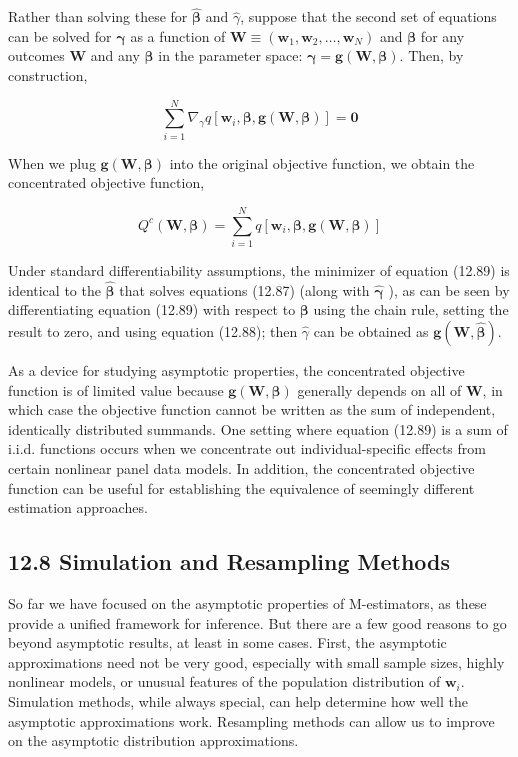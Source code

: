 \documentclass[10pt]{article}
\begin{document}
Rather than solving these for $\hat{\boldsymbol{\beta}}$ and $\hat{\gamma}$, suppose that the second set of equations can be solved for $\boldsymbol{\gamma}$ as a function of $\mathbf{W} \equiv\left(\mathbf{w}_{1}, \mathbf{w}_{2}, \ldots, \mathbf{w}_{N}\right)$ and $\boldsymbol{\beta}$ for any outcomes $\mathbf{W}$ and any $\boldsymbol{\beta}$ in the parameter space: $\boldsymbol{\gamma}=\mathbf{g}(\mathbf{W}, \boldsymbol{\beta})$. Then, by construction,


\begin{equation*}
\sum_{i=1}^{N} \nabla_{\gamma} q\left[\mathbf{w}_{i}, \boldsymbol{\beta}, \mathbf{g}(\mathbf{W}, \boldsymbol{\beta})\right]=\mathbf{0} \tag{12.88}
\end{equation*}


When we plug $\boldsymbol{g}(\mathbf{W}, \boldsymbol{\beta})$ into the original objective function, we obtain the concentrated objective function,


\begin{equation*}
Q^{c}(\mathbf{W}, \boldsymbol{\beta})=\sum_{i=1}^{N} q\left[\mathbf{w}_{i}, \boldsymbol{\beta}, \mathbf{g}(\mathbf{W}, \boldsymbol{\beta})\right] \tag{12.89}
\end{equation*}


Under standard differentiability assumptions, the minimizer of equation (12.89) is identical to the $\hat{\boldsymbol{\beta}}$ that solves equations (12.87) (along with $\hat{\boldsymbol{\gamma}}$ ), as can be seen by differentiating equation (12.89) with respect to $\boldsymbol{\beta}$ using the chain rule, setting the result to zero, and using equation (12.88); then $\hat{\gamma}$ can be obtained as $\mathbf{g}(\mathbf{W}, \hat{\boldsymbol{\beta}})$.

As a device for studying asymptotic properties, the concentrated objective function is of limited value because $\mathbf{g}(\mathbf{W}, \boldsymbol{\beta})$ generally depends on all of $\mathbf{W}$, in which case the objective function cannot be written as the sum of independent, identically distributed summands. One setting where equation (12.89) is a sum of i.i.d. functions occurs when we concentrate out individual-specific effects from certain nonlinear panel data models. In addition, the concentrated objective function can be useful for establishing the equivalence of seemingly different estimation approaches.

\subsection*{12.8 Simulation and Resampling Methods}
So far we have focused on the asymptotic properties of M-estimators, as these provide a unified framework for inference. But there are a few good reasons to go beyond asymptotic results, at least in some cases. First, the asymptotic approximations need not be very good, especially with small sample sizes, highly nonlinear models, or unusual features of the population distribution of $\mathbf{w}_{i}$. Simulation methods, while always special, can help determine how well the asymptotic approximations work. Resampling methods can allow us to improve on the asymptotic distribution approximations.
\end{document}
